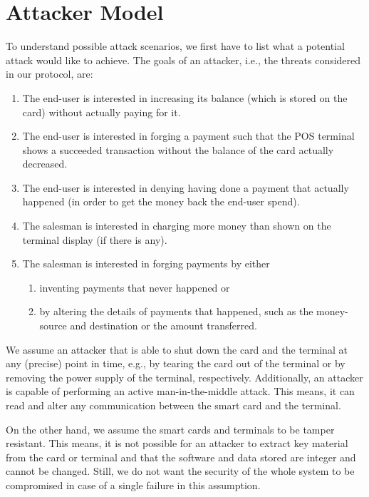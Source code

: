 \section{Attacker Model}
To understand possible attack scenarios, we first have to list what a potential attack would like to achieve.
The goals of an attacker, i.e., the threats considered in our protocol, are:
\begin{enumerate}[label={T\arabic*:}, leftmargin=2\parindent, ref={T\arabic*}]
    \item \label{thread:increaseWithoutPaying}
    The end-user is interested in increasing its balance (which is stored on the card) without actually paying for it.
    \item \label{thread:payWithoutDecrease}
    The end-user is interested in forging a payment such that the POS terminal shows a succeeded transaction without the balance of the card actually decreased.
    \item \label{thread:deneyPayment}
    The end-user is interested in denying having done a payment that actually happened (in order to get the money back the end-user spend).
    \item \label{thread:chargeMoreThanDisplayed}
    The salesman is interested in charging more money than shown on the terminal display (if there is any).
    \item The salesman is interested in forging payments by either 
    \begin{enumerate}[ref={\theenumi~\alph*}]
        \item \label{thread:inventNewPayments}
        inventing payments that never happened or
        \item \label{thread:alterPaymentDetails}
        by altering the details of payments that happened, such as the money-source and destination or the amount transferred.
    \end{enumerate}
\end{enumerate}

We assume an attacker that is able to shut down the card and the terminal at any (precise) point in time, e.g., by tearing the card out of the terminal or by removing the power supply of the terminal, respectively.
Additionally, an attacker is capable of performing an active man-in-the-middle attack.
This means, it can read and alter any communication between the smart card and the terminal.

On the other hand, we assume the smart cards and terminals to be tamper resistant.
This means, it is not possible for an attacker to extract key material from the card or terminal and that the software and data stored are integer and cannot be changed.
Still, we do not want the security of the whole system to be compromised in case of a single failure in this assumption.

